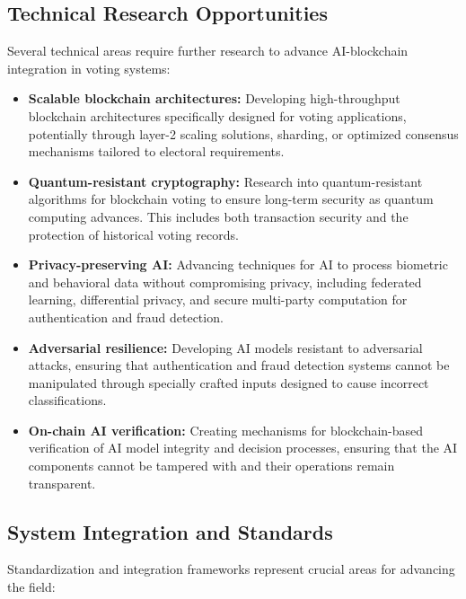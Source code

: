 \documentclass[conference]{IEEEtran}
\begin{document}
\subsection{Technical Research Opportunities}
Several technical areas require further research to advance AI-blockchain integration in voting systems:

\begin{itemize}
    \item \textbf{Scalable blockchain architectures:} Developing high-throughput blockchain architectures specifically designed for voting applications, potentially through layer-2 scaling solutions, sharding, or optimized consensus mechanisms tailored to electoral requirements.
    
    \item \textbf{Quantum-resistant cryptography:} Research into quantum-resistant algorithms for blockchain voting to ensure long-term security as quantum computing advances. This includes both transaction security and the protection of historical voting records.
    
    \item \textbf{Privacy-preserving AI:} Advancing techniques for AI to process biometric and behavioral data without compromising privacy, including federated learning, differential privacy, and secure multi-party computation for authentication and fraud detection.
    
    \item \textbf{Adversarial resilience:} Developing AI models resistant to adversarial attacks, ensuring that authentication and fraud detection systems cannot be manipulated through specially crafted inputs designed to cause incorrect classifications.
    
    \item \textbf{On-chain AI verification:} Creating mechanisms for blockchain-based verification of AI model integrity and decision processes, ensuring that the AI components cannot be tampered with and their operations remain transparent.
\end{itemize}

\subsection{System Integration and Standards}
Standardization and integration frameworks represent crucial areas for advancing the field:
\end{document}
